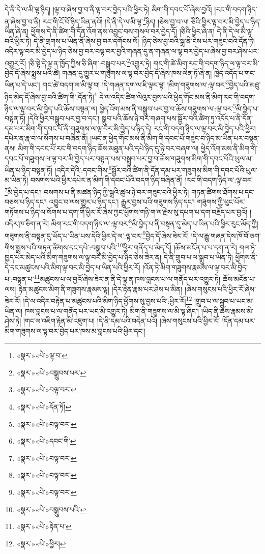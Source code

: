 དེ་ནི་དེ་ལ་མི་ལྟ་ཉིད། །ལྟ་བ་ཞེས་བྱ་བ་ནི་ལྟ་བར་བྱེད་པའི་ཕྱིར་ཏེ། མིག་གི་དབང་པོ་ཞེས་བྱའོ། །རང་གི་བདག་ཉིད་ན་ཞེས་བྱ་བ་ནི། རང་གི་ངོ་བོ་ཉིད་ཡིན་ནའོ། །དེ་ནི་དེ་ལ་མི་ལྟ་\footnote{«སྣར་»«པེ་»ལྟ་བ་}ཉིད། །ཅེས་བྱ་བ་ལ། ཅིའི་ཕྱིར་ལྟ་བར་མི་བྱེད་པ་ཉིད་ཡིན་ཞེ་ན། ཕྱོགས་དེ་ནི་ཚིག་གི་དོན་འོག་ནས་འབྱུང་བས་གསལ་བར་བྱེད་དོ། །ཅིའི་ཕྱིར་ཞེ་ན། དེ་ནི་དེ་ལ་མི་ལྟ་བའི་ཕྱིར་ཏེ། དེ་ནི་གྲགས་པ་ཡིན་ནོ་ཞེས་བྱ་བར་དགོངས་སོ། །ཉིད་ཅེས་བྱ་བའི་སྒྲ་ནི་ངེས་པར་གཟུང་བའི་དོན་ཏེ། འདིར་ལྟ་བར་མི་བྱེད་པ་ཉིད་ཅེས་བྱ་བར་བལྟ་བར་བྱའི་གཞན་དུ་ན་གཞན་ལ་ལྟ་བར་བྱེད་པ་ཞེས་བྱ་བར་ཤེས་པར་འགྱུར་རོ། །ཅི་སྟེ་དེ་ལྟ་ན་ཁྱོད་ཀྱིས་ཅི་ཞིག་:བསྒྲུབ་པར་\footnote{«སྣར་»«པེ་»བསྒྲུབས་པར་}འགྱུར་ཏེ། གང་གི་ཚེ་མིག་རང་གི་བདག་ཉིད་ལ་ལྟ་བར་མི་བྱེད་དོ་ཞེས་སྨྲས་པའི་ཚེ། གཞན་དུ་གྱུར་པ་གཟུགས་ལ་ལྟ་བར་བྱེད་དོ་ཞེས་ཁས་ལེན་ཏོ་ཞེ་ན། ཁྱེད་འདོད་པ་གང་ཡིན་པ་དེ་ཡང་། གང་ཚེ་བདག་ལ་མི་ལྟ་བ། །དེ་གཞན་དག་ལ་ཇི་ལྟར་ལྟ། །མིག་གཟུགས་ལ་:ལྟ་བར་\footnote{«སྣར་»«པེ་»བལྟ་བར་}བྱེད་པའི་མཐུ་ཉིད་མེད་དོ་ཞེས་བྱ་བའི་ཚིག་གི་:དོན་ཏེ།\footnote{«སྣར་»«པེ་»དོན་ཏོ།} དེ་ལ་འདིར་ཚིག་ལེའུར་བྱས་པའི་ཕྱེད་གོང་མས་ནི་མིག་རང་གི་བདག་ཉིད་ལ་ལྟ་བར་མི་བྱེད་པའི་ཆོས་བསྟན་ལ། ཕྱེད་འོག་མས་ནི་བསྒྲུབ་པར་བྱ་བ་ཆོས་གཟུགས་ལ་:ལྟ་བར་\footnote{«སྣར་»«པེ་»བལྟ་བར་}མི་བྱེད་པ་བསྟན་ཏོ། །དེའི་ཕྱིར་བསྒྲུབ་པར་བྱ་བ་དང་། སྒྲུབ་པའི་ཆོས་ཉེ་བར་གཞག་པས་སྦྱོར་བའི་ཚིག་ཏུ་འདོད་པ་ནི་དོན་དམ་པར་མིག་གི་དབང་པོ་ནི་གཟུགས་ལ་ལྟ་བར་མི་བྱེད་པ་ཉིད་དེ། རང་གི་བདག་ཉིད་ལ་ལྟ་བར་མི་བྱེད་པའི་ཕྱིར། དཔེར་ན་རྣ་བ་ལ་སོགས་པ་བཞིན་ནོ། །ཡང་ན་ཕྱེད་གོང་མས་ནི་མིག་གི་དབང་པོ་གཟུང་བ་ཉིད་མ་ཡིན་པར་བསྟན་ནས། མིག་གི་དབང་པོ་རང་གི་བདག་ཉིད་ཆོས་མཐུན་པའི་དཔེ་ཉིད་དུ་ཉེ་བར་བཞག་ལ། ཕྱེད་འོག་མས་ནི་མིག་གི་དབང་པོ་གཟུགས་ལ་ལྟ་བར་མི་བྱེད་པར་བསྟན་པས་བསྒྲུབ་པར་བྱ་བ་ཆོས་གཟུགས་མིག་གི་དབང་པོའི་ཡུལ་མ་ཡིན་པ་ཉིད་བསྟན་ཏོ། །འདིར་དེའི་:དབང་གིས་\footnote{«སྣར་»«པེ་»དབང་གི་}སྦྱོར་བའི་ཚིག་ནི་དོན་དམ་པར་གཟུགས་མིག་གི་དབང་པོའི་ཡུལ་མ་ཡིན་ཏེ། བསགས་པའི་ཕྱིར་དཔེར་ན་མིག་གི་དབང་པོའི་བདག་ཉིད་བཞིན་ནོ། །རང་གི་བདག་ཉིད་ལ་:ལྟ་བར་\footnote{«སྣར་»«པེ་»བལྟ་བར་}མི་བྱེད་པ་དང་། བསགས་པ་ནི་མཚན་ཉིད་ཀྱི་སྒྲའི་ཚུལ་ཉེ་བར་གཟུང་བའི་ཕྱིར་ཏེ། གཏན་ཚིགས་ཐོགས་པ་དང་བཅས་པ་ཉིད་དང་། འབྱུང་བ་ལས་གྱུར་པ་ཉིད་དང་། རྒྱུར་བྱས་པའི་གཟུགས་ཉིད་དང་། གཟུགས་ཀྱི་ཕུང་པོར་གཏོགས་པ་ཉིད་ལ་སོགས་པ་དག་གི་ཕྱིར་རོ་ཞེས་ཀྱང་ཕྱོགས་གཉི་ག་ལ་རྗེས་སུ་དཔག་པ་དག་བརྗོད་པར་བྱའོ། །འདིར་ཁ་ཅིག་ན་རེ། མིག་རང་གི་བདག་ཉིད་ལ་:ལྟ་བར་\footnote{«སྣར་»«པེ་»བལྟ་བར་}མི་བྱེད་པ་ནི་བསྟན་དུ་མེད་པ་ཡིན་པའི་ཕྱིར་རུང་མོད་ཀྱི། གཟུགས་ནི་བསྟན་དུ་ཡོད་པ་ཡིན་པས་དེའི་ཕྱིར་དེ་ལ་:ལྟ་བར་\footnote{«སྣར་»«པེ་»བལྟ་བར་}བྱེད་དོ་ཞེས་ཟེར་རོ། །དེ་ལ་རྒྱུ་གཞན་དེས་ཁོ་བོ་ཅག་གིས་སྨྲས་པའི་གཏན་ཚིགས་དང་དཔེ་:བསྒྲུབ་པའི་\footnote{«སྣར་»«པེ་»བསྒྲུབས་པའི་}ཕྱིར་གནོད་པ་མེད་དོ། །ཆོས་མངོན་པ་པ་དག་ན་རེ། གལ་ཏེ་ཁྱད་པར་མེད་པའི་མིག་གཟུགས་ལ་ལྟ་བར་མི་བྱེད་པ་ཉིད་ཅེས་ཟེར་ན། དེ་ནི་གྲུབ་པ་ལ་སྒྲུབ་པ་ཡིན་ཏེ། ཕྱོགས་ནི་དེ་དང་མཚུངས་པའི་མིག་ལྟ་བར་མི་བྱེད་པ་ཡིན་པའི་ཕྱིར་རོ། །འོན་ཏེ་མིག་གཟུགས་རྣམས་ལ་ལྟ་བར་མི་བྱེད་པ་:བསྟན་པ་\footnote{«སྣར་»«པེ་»རྟེན་པ་}མཚུངས་པ་ལ་བྱའོ་ཞེས་ཟེར་ན་ནི་དེ་ལྟ་ན་ཁས་བླངས་པ་ལ་གནོད་པར་འགྱུར་ཏེ། ཆོས་མངོན་པ་ལས། རྟེན་མཚུངས་མིག་ནི་གཟུགས་རྣམས་ལྟ། །དེར་རྟེན་རྣམ་པར་ཤེས་པ་མིན། །ཞེས་གསུངས་པའི་ཕྱིར་རོ་ཞེས་ཟེར་རོ། །དེ་ལ་འདིར་བརྟེན་པ་མཚུངས་པའི་མིག་ཉིད་ཕྱོགས་སུ་བྱས་པའི་:ཕྱིར་རོ།\footnote{«སྣར་»«པེ་»ཕྱིར།} །གྲུབ་པ་ལ་སྒྲུབ་པ་ཡང་མ་ཡིན་ལ། ཁས་བླངས་པ་ལ་གནོད་པར་ཡང་མི་འགྱུར་ཏེ། མིག་ནི་གཟུགས་ལ་མི་ལྟ་ཞིང་། །ཡིད་ནི་ཆོས་རྣམས་མི་ཤེས་ཏེ། །གང་ལ་འཇིག་རྟེན་མི་འཇུག་པ། །དེ་ནི་དམ་པའི་བདེན་པའོ། །ཞེས་གསུངས་པའི་ཕྱིར་རོ། །དོན་དམ་པར་མིག་གཟུགས་ལ་ལྟ་བར་བྱེད་པར་ཁས་མ་བླངས་པའི་ཕྱིར་དང་། 